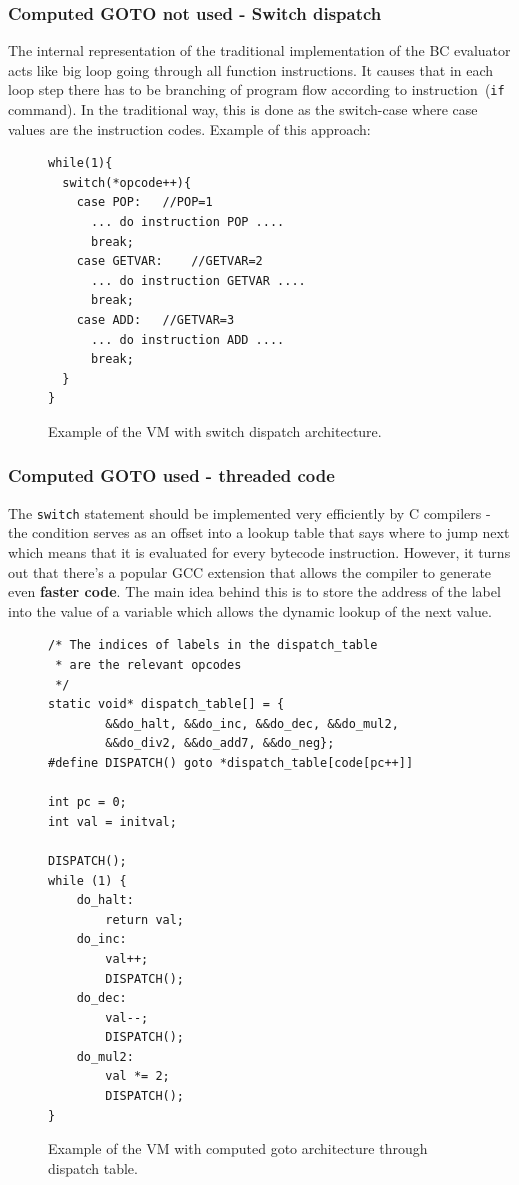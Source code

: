 \documentclass[thesis=M,english]{FITthesis}[2018/10/20]
\newcommand{\code}[1]{\texttt{#1}}
\begin{document}
\subsubsection{Computed GOTO not used - Switch dispatch}\label{computed-goto-not-used}

The internal representation of the traditional implementation of the BC evaluator acts like big loop going through all function instructions. It causes that in each loop step there has to be branching of program flow according to instruction~(\code{if} command). In the traditional way, this is done as the switch-case where case values are the instruction codes. Example of this approach:

\begin{figure}[!htb]
\begin{lstlisting}
while(1){
  switch(*opcode++){
    case POP:	//POP=1
      ... do instruction POP ....
      break;
    case GETVAR:	//GETVAR=2
      ... do instruction GETVAR ....
      break;
    case ADD:	//GETVAR=3
      ... do instruction ADD ....
      break;
  }
}
\end{lstlisting}
\caption{\label{fig:goto-not-used} Example of the VM with switch dispatch architecture.}
\end{figure}

\subsubsection{Computed GOTO used - threaded code}\label{computed-goto-used}

The \code{switch} statement should be implemented very efficiently by C compilers - the condition serves as an offset into a lookup table that says where to jump next which means that it is evaluated for every bytecode instruction. However, it turns out that there's a popular GCC extension that allows the compiler to generate even \textbf{faster code}. The main idea behind this is to store the address of the label into the value of a variable which allows the dynamic lookup of the next value.

\begin{figure}[!htb]
\begin{lstlisting}
/* The indices of labels in the dispatch_table
 * are the relevant opcodes
 */
static void* dispatch_table[] = {
        &&do_halt, &&do_inc, &&do_dec, &&do_mul2,
        &&do_div2, &&do_add7, &&do_neg};
#define DISPATCH() goto *dispatch_table[code[pc++]]

int pc = 0;
int val = initval;

DISPATCH();
while (1) {
    do_halt:
        return val;
    do_inc:
        val++;
        DISPATCH();
    do_dec:
        val--;
        DISPATCH();
    do_mul2:
        val *= 2;
        DISPATCH();
}
\end{lstlisting}
\caption{\label{fig:goto-used-table} Example of the VM with computed goto architecture through dispatch table.}
\end{figure}
\end{document}
